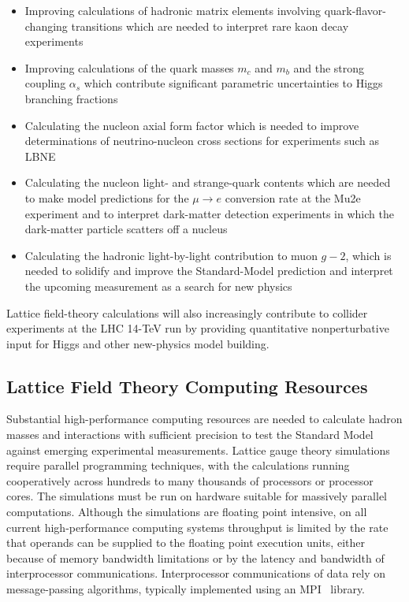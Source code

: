 \begin{itemize}

\item Improving calculations of hadronic matrix elements involving
quark-flavor-changing transitions which are needed to interpret rare kaon
decay experiments

\item Improving calculations of the quark masses $m_c$ and $m_b$ and the
strong coupling $\alpha_s$ which contribute significant parametric
uncertainties to Higgs branching fractions

\item Calculating the nucleon axial form factor which is needed to improve
determinations of neutrino-nucleon cross sections for experiments such as
LBNE

\item Calculating the nucleon light- and strange-quark contents which are
needed to make model predictions for the $\mu \to e$ conversion rate at the
Mu2e experiment and to interpret dark-matter detection experiments in
which the dark-matter particle scatters off a nucleus

\item Calculating the hadronic light-by-light contribution to muon $g-2$, which
is needed to solidify and improve the Standard-Model prediction and interpret
the upcoming measurement as a search for new physics

\end{itemize}

Lattice field-theory calculations will also increasingly contribute to
collider experiments at the LHC 14-TeV run by providing quantitative
nonperturbative input for Higgs and other new-physics model building.

\subsection{Lattice Field Theory Computing Resources}

Substantial high-performance computing resources are needed to calculate
hadron masses and interactions with sufficient precision to test the Standard
Model against emerging experimental measurements.  Lattice gauge theory
simulations require parallel programming techniques, with the calculations
running cooperatively across hundreds to many thousands of processors or
processor cores.  The simulations must be run on hardware suitable for
massively parallel computations.  Although the simulations are
floating point intensive, on all current high-performance computing systems
throughput is limited by the rate that operands can be supplied to the
floating point execution units, either because of memory bandwidth limitations
or by the latency and bandwidth of interprocessor communications.
Interprocessor communications of data rely on message-passing
algorithms, typically implemented using an MPI~\cite{MPI} library.

